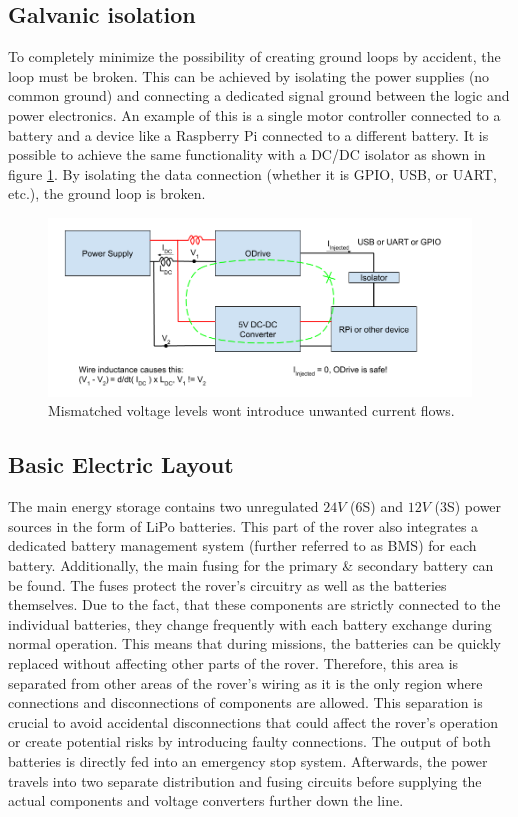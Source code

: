     \subsection{Galvanic isolation}
    
    To completely minimize the possibility of creating ground loops by accident, the loop must be broken. This can be achieved by isolating the power supplies (no common ground) and connecting a dedicated signal ground between the logic and power electronics. An example of this is a single motor controller connected to a battery and a device like a Raspberry Pi connected to a different battery. It is possible to achieve the same functionality with a DC/DC isolator as shown in figure \ref{ground_loop_fix}. By isolating the data connection (whether it is GPIO, USB, or UART, etc.), the ground loop is broken.
    
    \begin{figure}[h]
    \includegraphics[width=\textwidth]{contents/figures/ground_loop_fix.png}
    \caption{Mismatched voltage levels wont introduce unwanted current flows.}
    \label{ground_loop_fix}
    \end{figure}

    \clearpage
    \subsection{Basic Electric Layout}

    The main energy storage contains two unregulated $24V$ (6S) and $12V$ (3S) power sources in the form of LiPo batteries. This part of the rover also integrates a dedicated battery management system (further referred to as BMS) for each battery. Additionally, the main fusing for the primary \& secondary battery can be found. The fuses protect the rover's circuitry as well as the batteries themselves. Due to the fact, that these components are strictly connected to the individual batteries, they change frequently with each battery exchange during normal operation. This means that during missions, the batteries can be quickly replaced without affecting other parts of the rover. Therefore, this area is separated from other areas of the rover's wiring as it is the only region where connections and disconnections of components are allowed. This separation is crucial to avoid accidental disconnections that could affect the rover's operation or create potential risks by introducing faulty connections. The output of both batteries is directly fed into an emergency stop system. Afterwards, the power travels into two separate distribution and fusing circuits before supplying the actual components and voltage converters further down the line.
    
